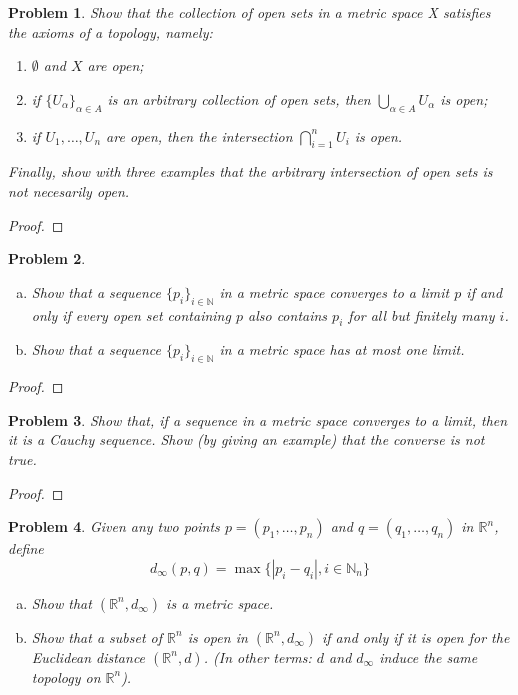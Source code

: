 \documentclass[11pt]{article}
\newcommand{\mn}{\mathbb{N}}
\newcommand{\mr}{\mathbb{R}}
\newcommand{\<}{\langle}
\renewcommand{\>}{\rangle}
\newtheorem{problem}{Problem}[section]
\newenvironment{fprob}
  {\begin{fcolor}\begin{problem}}
  {\end{problem}\end{fcolor}}
\theoremstyle{definition}
\begin{document}
\begin{fprob}
    Show that the collection of open sets in a metric space X satisfies the axioms of a topology, namely:
    \begin{enumerate}
        \item $\emptyset$ and $X$ are open;
        \item if $\{U_\alpha\}_{\alpha\in A}$ is an arbitrary collection of open sets, 
        then $\bigcup_{\alpha\in A}U_\alpha$ is open;
        \item if $U_1, \dots, U_n$ are open, then the intersection $\bigcap_{i=1}^nU_i$ is open.
    \end{enumerate}
    Finally, show with three examples that the arbitrary intersection of open sets is not necesarily open.
\end{fprob}

\begin{proof}
\end{proof}

\begin{fprob}
    \begin{enumerate}[(a)]
        \item Show that a sequence $\{p_i\}_{i\in\mn}$ in a metric space converges 
        to a limit $p$ if and only if every open set containing $p$ also contains $p_i$ 
        for all but finitely many $i$.
        \item Show that a sequence $\{p_i\}_{i\in\mn}$ in a metric space has at most one limit.
    \end{enumerate}
\end{fprob}

\begin{proof}
\end{proof}

\begin{fprob}
    Show that, if a sequence in a metric space converges to a limit, then it is a Cauchy
    sequence. Show (by giving an example) that the converse is not true.
\end{fprob}

\begin{proof}
\end{proof}

\begin{fprob}
    Given any two points $p = (p_1,\dots,p_n)$ and $q = (q_1,\dots, q_n)$ in $\mr^n$, define
    \[
        d_\infty(p,q) = \max\{|p_i-q_i|, i\in\mn_n\}  
    \]
    \begin{enumerate}[(a)]
        \item Show that $(\mr^n,d_\infty)$ is a metric space.
        \item Show that a subset of $\mr^n$ is open in $(\mr^n,d_\infty)$ if and only if it is open 
        for the Euclidean distance $(\mr^n,d)$. (In other terms: $d$ and $d_\infty$ induce the same 
        topology on $\mr^n$).
    \end{enumerate}
\end{fprob}
\end{document}
